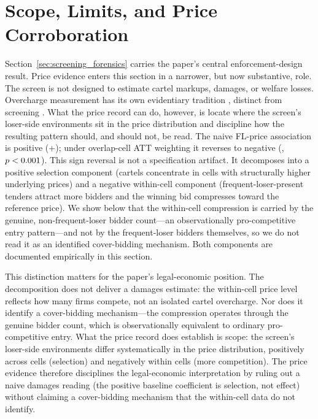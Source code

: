 \section{Scope, Limits, and Price Corroboration}
\label{sec:price_scope_conclusion}

Section~\ref{sec:screening_forensics} carries the paper's
central enforcement-design result. Price evidence enters this
section in a narrower, but now substantive, role. The screen is
not designed to estimate cartel markups, damages, or welfare
losses. Overcharge measurement has its own evidentiary tradition
\citep{bryant1991price,connor2007price}, distinct from screening
\citep{marshall2012economics,harrington2008detecting}. What the
price record can do, however, is locate where the screen's
loser-side environments sit in the price distribution and
discipline how the resulting pattern should, and should not, be
read. The naive FL-price association is positive (+\valBetaBroad);
under overlap-cell ATT weighting it reverses to negative
(\valScopeOverlapCoef, $p<0.001$).
This sign reversal is not a specification artifact. It decomposes
into a positive selection component (cartels concentrate in cells
with structurally higher underlying prices) and a negative
within-cell component (frequent-loser-present tenders attract more
bidders and the winning bid compresses toward the reference
price). We show below that the within-cell compression is carried
by the genuine, non-frequent-loser bidder count---an
observationally pro-competitive entry pattern---and not by the
frequent-loser bidders themselves, so we do not read it as an
identified cover-bidding mechanism. Both components are documented
empirically in this section.

This distinction matters for the paper's legal-economic
position. The decomposition does not deliver a damages estimate:
the within-cell price level reflects how many firms compete, not
an isolated cartel overcharge. Nor does it identify a
cover-bidding mechanism---the compression operates through the
genuine bidder count, which is observationally equivalent to
ordinary pro-competitive entry. What the price record does
establish is scope: the screen's loser-side environments differ
systematically in the price distribution, positively across cells
(selection) and negatively within cells (more competition). The
price evidence therefore disciplines the legal-economic
interpretation by ruling out a naive damages reading (the
positive baseline coefficient is selection, not effect) without
claiming a cover-bidding mechanism that the within-cell data do
not identify.

